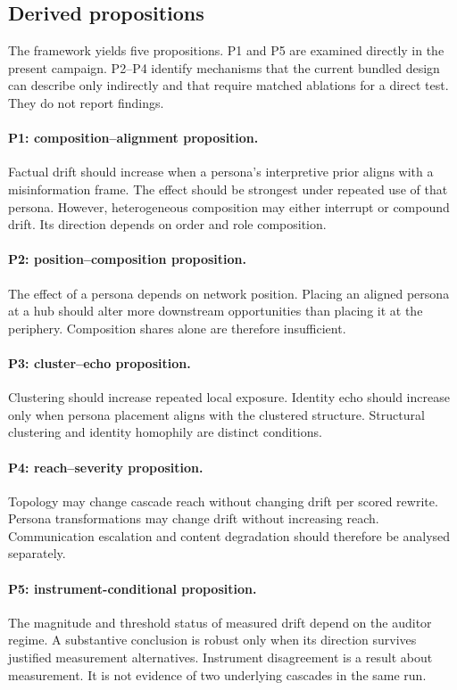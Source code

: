 \subsection{Derived propositions}
\label{subsec:derived-propositions}

The framework yields five propositions.
P1 and P5 are examined directly in the present campaign.
P2--P4 identify mechanisms that the current bundled design can describe only
indirectly and that require matched ablations for a direct test.
They do not report findings.

\paragraph{P1: composition--alignment proposition.}
Factual drift should increase when a persona's interpretive prior aligns with a misinformation frame.
The effect should be strongest under repeated use of that persona.
However, heterogeneous composition may either interrupt or compound drift.
Its direction depends on order and role composition.

\paragraph{P2: position--composition proposition.}
The effect of a persona depends on network position.
Placing an aligned persona at a hub should alter more downstream opportunities than placing it at the periphery.
Composition shares alone are therefore insufficient.

\paragraph{P3: cluster--echo proposition.}
Clustering should increase repeated local exposure.
Identity echo should increase only when persona placement aligns with the clustered structure.
Structural clustering and identity homophily are distinct conditions.

\paragraph{P4: reach--severity proposition.}
Topology may change cascade reach without changing drift per scored rewrite.
Persona transformations may change drift without increasing reach.
Communication escalation and content degradation should therefore be analysed separately.

\paragraph{P5: instrument-conditional proposition.}
The magnitude and threshold status of measured drift depend on the auditor regime.
A substantive conclusion is robust only when its direction survives justified measurement alternatives.
Instrument disagreement is a result about measurement.
It is not evidence of two underlying cascades in the same run.

